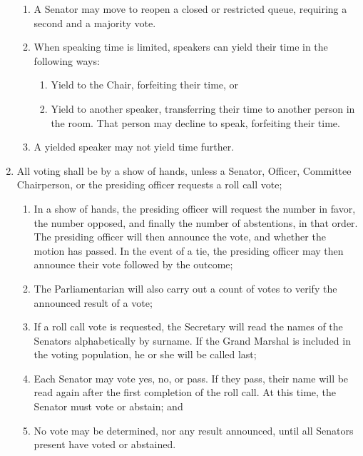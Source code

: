 \begin{enumerate}
\begin{enumerate}
    \item A Senator may move to reopen a closed or restricted queue, requiring a second and a majority vote.

   \item When speaking time is limited, speakers can yield their time in the following ways:
    \begin{enumerate}
        \item Yield to the Chair, forfeiting their time, or
        \item Yield to another speaker, transferring their time to another person in the room. That person may decline to speak, forfeiting their time.
    \end{enumerate}

    \item A yielded speaker may not yield time further.
\end{enumerate}

\item All voting shall be by a show of hands, unless a Senator, Officer, Committee Chairperson, or the presiding officer requests a roll call vote;
\begin{enumerate}
    \item In a show of hands, the presiding officer will request the number in favor, the number opposed, and finally the number of abstentions, in that order. The presiding officer will then announce the vote, and whether the motion has passed. In the event of a tie, the presiding officer may then announce their vote followed by the outcome;
    \item The Parliamentarian will also carry out a count of votes to verify the announced result of a vote;
    \item If a roll call vote is requested, the Secretary will read the names of the Senators alphabetically by surname. If the Grand Marshal is included in the voting population, he or she will be called last;
    \item Each Senator may vote yes, no, or pass. If they pass, their name will be read again after the first completion of the roll call. At this time, the Senator must vote or abstain; and
    \item No vote may be determined, nor any result announced, until all Senators present have voted or abstained.
\end{enumerate}

\end{enumerate}
